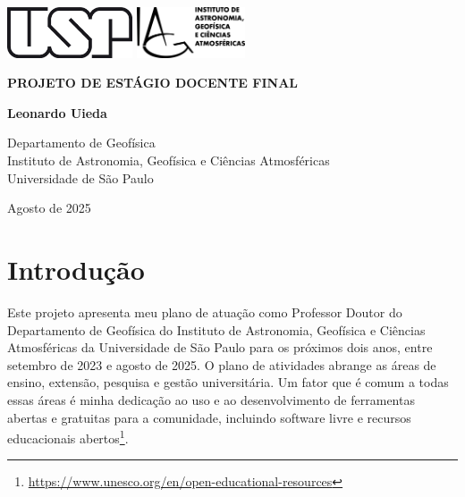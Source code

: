 \documentclass[12pt,a4paper,oneside]{book}
\newcommand{\Title}{Projeto de Estágio Docente Final}
\newcommand{\Year}{2025}
\newcommand{\Date}{Agosto de \Year{}}
\newcommand{\Author}{Leonardo Uieda}
\begin{document}
\pagestyle{empty}
\frontmatter

\begin{titlepage}
  \begin{center}
    \includegraphics[height=1.5cm]{figures/usp.png}
    \hfill
    \includegraphics[height=1.5cm]{figures/iag.png}
    \vspace{9cm}

    \textbf{\Huge \MakeUppercase{\Title{}}}
    \vspace{2cm}

    \textbf{\LARGE \Author{}}
    \vfill

    Departamento de Geofísica
    \\
    Instituto de Astronomia, Geofísica e Ciências Atmosféricas
    \\
    Universidade de São Paulo
    \vspace{2cm}

    \Date{}
  \end{center}
\end{titlepage}

\tableofcontents

\mainmatter
\pagestyle{fancy}

\chapter{Introdução}

Este projeto apresenta meu plano de atuação como Professor Doutor do
Departamento de Geofísica do Instituto de Astronomia, Geofísica e Ciências
Atmosféricas da Universidade de São Paulo para os próximos dois anos, entre
setembro de 2023 e agosto de 2025.
O plano de atividades abrange as áreas de ensino, extensão, pesquisa e gestão
universitária.
Um fator que é comum a todas essas áreas é minha dedicação ao uso e ao
desenvolvimento de ferramentas abertas e gratuitas para a comunidade, incluindo
software livre e recursos educacionais
abertos\footnote{\url{https://www.unesco.org/en/open-educational-resources}}.
\end{document}
